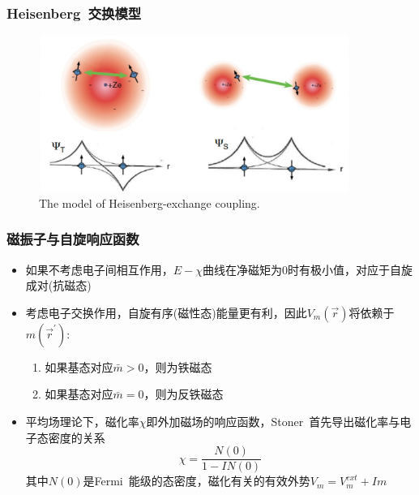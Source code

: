 {\frame
{
	\frametitle{\textrm{Heisenberg~}交换模型}
\begin{figure}[h!]
\centering
\includegraphics[height=2.0in,width=4.0in,viewport=0 0 580 290,clip]{Figures/Heisenberg_model.jpg}
\caption{\tiny \textrm{The model of Heisenberg-exchange coupling.}}%
\label{Heisenberg_Model}
\end{figure} 
}

\frame
{
	\frametitle{磁振子与自旋响应函数}
	\begin{itemize}
		\item 如果不考虑电子间相互作用，$E-\chi$曲线在净磁矩为0时有极小值，对应于自旋成对(抗磁态)
		\item 考虑电子交换作用，自旋有序(磁性态)能量更有利，因此$V_m(\vec r)$将依赖于$m(\vec r^{\prime})$:\\
			\begin{enumerate}
				\item 如果基态对应$\bar m>0$，则为铁磁态
				\item 如果基态对应$\bar m=0$，则为反铁磁态
			\end{enumerate}
		\item 平均场理论下，磁化率$\chi$即外加磁场的响应函数，\textrm{Stoner~}首先导出磁化率与电子态密度的关系
			\begin{displaymath}
				\chi=\frac{N(0)}{1-IN(0)}
			\end{displaymath}
			其中$N(0)$是\textrm{Fermi~}能级的态密度，磁化有关的有效外势$V_m=V_m^{ext}+Im$
	\end{itemize}
}

}
